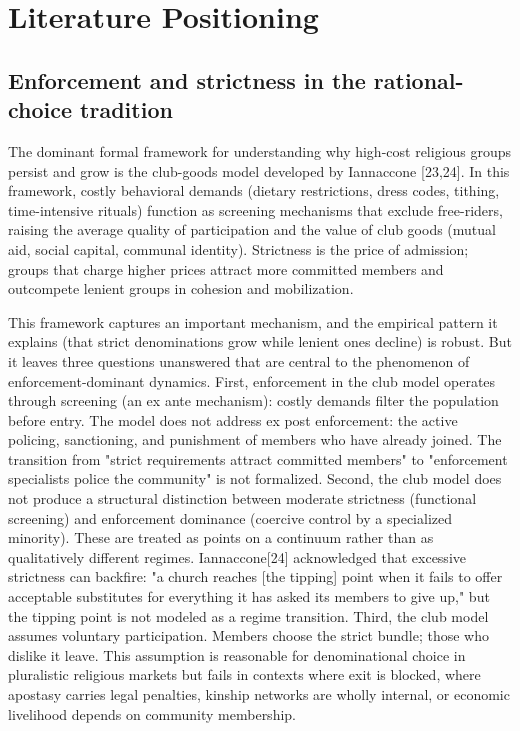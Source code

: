 \documentclass[12pt]{article}
\begin{document}
%
\section{Literature Positioning}

%
\subsection{Enforcement and strictness in the rational-choice tradition}

The dominant formal framework for understanding why high-cost religious groups persist and grow is the club-goods model developed by Iannaccone [23,24]. In this framework, costly behavioral demands (dietary restrictions, dress codes, tithing, time-intensive rituals) function as screening mechanisms that exclude free-riders, raising the average quality of participation and the value of club goods (mutual aid, social capital, communal identity). Strictness is the price of admission; groups that charge higher prices attract more committed members and outcompete lenient groups in cohesion and mobilization.

This framework captures an important mechanism, and the empirical pattern it explains (that strict denominations grow while lenient ones decline) is robust. But it leaves three questions unanswered that are central to the phenomenon of enforcement-dominant dynamics. First, enforcement in the club model operates through screening (an ex ante mechanism): costly demands filter the population before entry. The model does not address ex post enforcement: the active policing, sanctioning, and punishment of members who have already joined. The transition from "strict requirements attract committed members" to "enforcement specialists police the community" is not formalized. Second, the club model does not produce a structural distinction between moderate strictness (functional screening) and enforcement dominance (coercive control by a specialized minority). These are treated as points on a continuum rather than as qualitatively different regimes. Iannaccone[24] acknowledged that excessive strictness can backfire: "a church reaches [the tipping] point when it fails to offer acceptable substitutes for everything it has asked its members to give up," but the tipping point is not modeled as a regime transition. Third, the club model assumes voluntary participation. Members choose the strict bundle; those who dislike it leave. This assumption is reasonable for denominational choice in pluralistic religious markets but fails in contexts where exit is blocked, where apostasy carries legal penalties, kinship networks are wholly internal, or economic livelihood depends on community membership.
\end{document}
